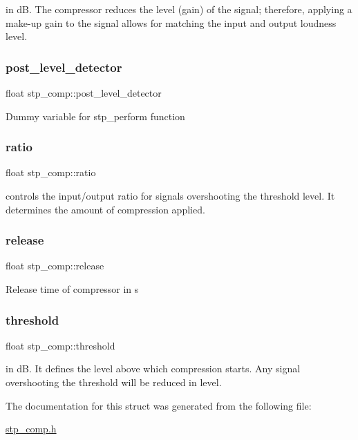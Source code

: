 in dB. The compressor reduces the level (gain) of the signal; therefore, applying a make-\/up gain to the signal allows for matching the input and output loudness level. \mbox{\label{structstp__comp_a4f4614383b3dc45ef0d988670dea4cf7}} 
\subsubsection{\texorpdfstring{post\+\_\+level\+\_\+detector}{post\_level\_detector}}
{\footnotesize\ttfamily float stp\+\_\+comp\+::post\+\_\+level\+\_\+detector}

Dummy variable for stp\+\_\+perform function \mbox{\label{structstp__comp_af974f00e16ea96857c98da1e03da87fa}} 
\subsubsection{\texorpdfstring{ratio}{ratio}}
{\footnotesize\ttfamily float stp\+\_\+comp\+::ratio}

controls the input/output ratio for signals overshooting the threshold level. It determines the amount of compression applied. \mbox{\label{structstp__comp_a7e17e06c076d551fc4f85343b9a1804c}} 
\subsubsection{\texorpdfstring{release}{release}}
{\footnotesize\ttfamily float stp\+\_\+comp\+::release}

Release time of compressor in s \mbox{\label{structstp__comp_a9088e7fa7f1326cd58285b1436f51a13}} 
\subsubsection{\texorpdfstring{threshold}{threshold}}
{\footnotesize\ttfamily float stp\+\_\+comp\+::threshold}

in dB. It defines the level above which compression starts. Any signal overshooting the threshold will be reduced in level. 

The documentation for this struct was generated from the following file\+:\begin{DoxyCompactItemize}
\item 
\mbox{\hyperlink{stp__comp_8h}{stp\+\_\+comp.\+h}}\end{DoxyCompactItemize}
